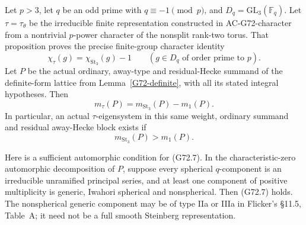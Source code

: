 \begin{theorem}
\label{AC-G72}
Let \(p>3\), let \(q\) be an odd prime with
\(q\equiv-1\pmod p\), and
\(D_q=\mathrm{GL}_3(\mathbb F_q)\).
Let \(\tau=\tau_\theta\) be the irreducible finite representation
constructed in AC-G72-character from a nontrivial \(p\)-power
character of the nonsplit rank-two torus.  That proposition proves
the precise finite-group character identity
\[
       \chi_\tau(g)=\chi_{\mathrm{St}_3}(g)-1
       \qquad(g\in D_q\text{ of order prime to }p).
 \tag{G72.5}
\]
Let \(P\) be the actual ordinary, away-type and residual-Hecke
summand of the definite-form lattice from Lemma~\ref{G72-definite},
with all its stated integral hypotheses.  Then
\[
             m_\tau(P)=m_{\mathrm{St}_3}(P)-m_1(P).
 \tag{G72.6}
\]
In particular, an actual \(\tau\)-eigensystem in this same
weight, ordinary summand and residual away-Hecke block exists if
\[
                     m_{\mathrm{St}_3}(P)>m_1(P).
 \tag{G72.7}
\]

Here is a sufficient automorphic condition for (G72.7).  In the
characteristic-zero automorphic decomposition of \(P\), suppose
every spherical \(q\)-component is an irreducible unramified
principal series, and at least one component of positive
multiplicity is generic, Iwahori spherical and nonspherical.
Then (G72.7) holds.  The nonspherical generic component may be
of type IIa or IIIa in Flicker's \S11.5, Table~A; it need not
be a full smooth Steinberg representation.
\end{theorem}
